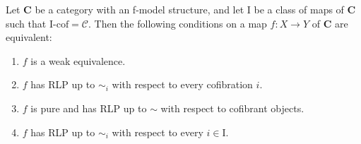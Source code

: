 \documentclass{amsart}
\theoremstyle{definition}
\newcommand{\cof}{\mathcal{C}}
\newcommand{\cat}[1]{\mathbf{#1}}
\newcommand{\C}{\cat{C}}
\newcommand{\I}{\mathrm{I}}
\newcommand{\class}[2]{#1\text{-}\mathrm{#2}}
\newcommand{\Icof}[1][\I]{\class{#1}{cof}}
\begin{document}

\begin{prop}[min-we]
Let $\C$ be a category with an f-model structure, and let $\I$ be a class of maps of $\C$ such that $\Icof = \cof$.
Then the following conditions on a map $f : X \to Y$ of $\C$ are equivalent:
\begin{enumerate}
\item $f$ is a weak equivalence.
\item $f$ has RLP up to $\sim_i$ with respect to every cofibration $i$.
\item $f$ is pure and has RLP up to $\sim$ with respect to cofibrant objects.
\item $f$ has RLP up to $\sim_i$ with respect to every $i \in \I$.
\end{enumerate}
\end{prop}
\end{document}

